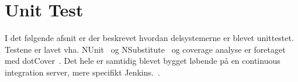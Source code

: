\section{Unit Test}
I det følgende afsnit er der beskrevet hvordan delsystemerne er blevet unittestet. Testene er lavet vha. NUnit~\cite{NUnit} og NSubstitute~\cite{NSubstitute} og coverage analyse er foretaget med dotCover~\cite{dotCover}. Det hele er samtidig blevet bygget løbende på en continuous integration server, mere specifikt Jenkins.~\cite{Jenkins}.\\




